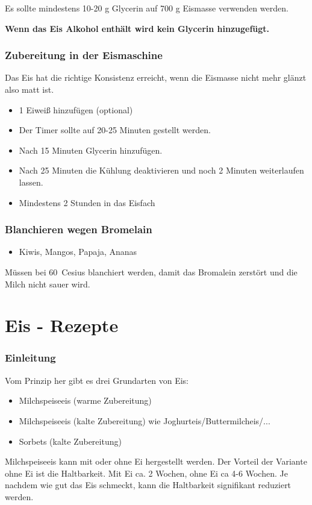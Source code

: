 \documentclass[12pt]{article}
\newcommand\degree[1]{\mbox{#1 \textdegree{} Cesius}}
\begin{document}
Es sollte mindestens 10-20 g Glycerin auf 700 g Eismasse verwenden werden. 

\textbf{Wenn das Eis Alkohol enthält wird kein Glycerin hinzugefügt. }


\section{Zubereitung in der Eismaschine}
Das Eis hat die richtige Konsistenz erreicht, wenn die Eismasse nicht mehr glänzt also matt ist. 
\begin{itemize}
  \item 1 Eiweiß hinzufügen (optional)
  \item Der Timer sollte auf 20-25 Minuten gestellt werden.
  \item Nach 15 Minuten Glycerin hinzufügen.
  \item Nach 25 Minuten die Kühlung deaktivieren und noch 2 Minuten weiterlaufen lassen.
  \item Mindestens 2 Stunden in das Eisfach
\end{itemize}


\section{Blanchieren wegen Bromelain}
\begin{itemize}
  \item Kiwis, Mangos, Papaja, Ananas
\end{itemize}
Müssen bei \degree{60} blanchiert werden, damit das Bromalein zerstört und die Milch nicht sauer wird.

\newpage
\part{Eis - Rezepte}

\section {Einleitung}
Vom Prinzip her gibt es drei Grundarten von Eis:
\begin{itemize}
  \item Milchspeiseeis (warme Zubereitung)
  \item Milchspeiseeis (kalte Zubereitung) wie Joghurteis/Buttermilcheis/...
  \item Sorbets (kalte Zubereitung)
\end{itemize}

Milchspeiseeis kann mit oder ohne Ei hergestellt werden. Der Vorteil der  Variante ohne Ei ist die Haltbarkeit. Mit Ei ca. 2 Wochen, ohne Ei ca 4-6 Wochen. Je nachdem wie gut das Eis schmeckt, kann die Haltbarkeit signifikant reduziert werden.
\end{document}
